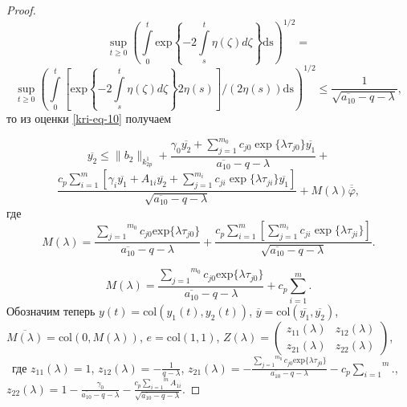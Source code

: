 \begin{proof}
\begin{equation*}
\sup\limits_{t\ge 0}\left(\overset t{\underset 0{\int
}}\text{exp}\left\{-2\overset t{\underset s{\int }}\eta (\zeta )\mathit{d\zeta
}\right\}\text{ds}\right)^{1/2}=
\end{equation*}
\begin{equation*}
\sup\limits_{t\ge 0}\left(\overset
t{\underset 0{\int }}\left[\text{exp}\left\{-2\overset t{\underset s{\int }}\eta (\zeta )\mathit{d\zeta }\right\}2\eta
(s)\right]/(2\eta (s))\text{ds}\right)^{1/2}\le \frac 1{\sqrt{\overline{a_{10}}-q-\lambda
}},
\end{equation*}
то из оценки \eqref{kri-eq-10} получаем

\begin{equation*}
\overline{y_2} \leq \|b_2\|_{k^1_{2p}} + \frac{\gamma_0\overline{y_2}+\sum\limits_{j=1}^{m_0} c_{j0}\exp \{\lambda\tau_{j0} \} \overline{y_1}}{\overline{a_{10}}-q-\lambda} +
\end{equation*}
\begin{equation}\label{kri-eq-11}
\frac{c_p \sum\limits_{i=1}^{m} \left[ \gamma_i\overline{y_1}+A_{1i}\overline{y_2}+\sum\limits_{j=1}^{m_i} c_{ji}\exp\{\lambda\tau_{ji} \} \overline{y_1} \right]}{\sqrt{\overline{a_{10}}-q-\lambda}} + M(\lambda)\overline{\overline{\varphi}},
\end{equation}
где
\begin{equation*}
M(\lambda )=\frac{\overset{m_0}{\underset{j=1}{\sum }}c_{\mathit{j0}}\text{exp}\{\text{$\lambda \tau
		$}_{\mathit{j0}}\}}{\overline{a_{10}}-q-\lambda }+ \frac{c_p \sum\limits_{i=1}^{m}\left[\sum\limits_{j=1}^{m_i} c_{ji}\exp\{\lambda\tau_{ji} \}\right]}{\sqrt{\overline{a_{10}}-q-\lambda}}.
\end{equation*}

\begin{equation*}
M(\lambda )=\frac{\overset{m_0}{\underset{j=1}{\sum }}c_{\mathit{j0}}\text{exp}\{\text{$\lambda \tau
$}_{\mathit{j0}}\}}{\overline{a_{10}}-q-\lambda }+c_p\overset m{\underset{i=1}{\sum }}.
\end{equation*}
Обозначим теперь  $y(t)=\text{col}(y_1(t),y_2(t))$,  $\overline
y=\text{col}(\overline{y_1},\overline{y_2})$,  $\overline{M(\lambda
)}=\text{col}(0,M(\lambda ))$,  $e=\text{col}(1,1)$,  $Z(\lambda
)=\left(\begin{matrix}z_{11}(\lambda )&z_{12}(\lambda )\\z_{21}(\lambda )&z_{22}(\lambda )\end{matrix}\right)$, \ где
$z_{11}(\lambda )=1$,  $z_{12}(\lambda )=-\frac 1{q-\lambda }$,  $z_{21}(\lambda
)=-\frac{\overset{m_0}{\underset{j=1}{\sum }}c_{\mathit{j0}}\text{exp}\{\text{$\lambda \tau
$}_{\mathit{j0}}\}}{\overline{a_{10}}-q-\lambda }-c_p\overset m{\underset{i=1}{\sum }}.$, \  $z_{22}(\lambda
)=1-\frac{\gamma _0}{\overline{a_{10}}-q-\lambda }-\frac{c_p\overset m{\underset{i=1}{\sum
}}A_{1i}}{\sqrt{\overline{a_{10}}-q-\lambda }}.$


\end{proof}
